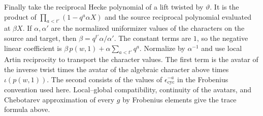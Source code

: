Finally take the reciprocal Hecke polynomial of a lift twisted by \(\vartheta\).
It is the product of \(\prod_{a<t'}(1-q^a\alpha X)\) and the source reciprocal polynomial
evaluated at \(\beta X\). If \(\alpha,\alpha'\) are the normalized uniformizer values of the
characters on the source and target, then \(\beta=q^{t'}\alpha/\alpha'\).
The constant terms are \(1\), so the negative linear coefficient is
\(\beta\,p(w,1)+\alpha\sum_{a<t'}q^a\).
Normalize by \(\alpha^{-1}\) and use local Artin reciprocity to transport the character values.
The first term is the avatar of the inverse twist times the avatar of the algebraic character above
times \(\iota(p(w,1))\). The second consists of the values of \(\epsilon_{\mathrm{cyc}}^{-a}\)
in the Frobenius convention used here. Local--global compatibility, continuity of the avatars,
and Chebotarev approximation of every \(g\) by Frobenius elements give the trace formula above.
